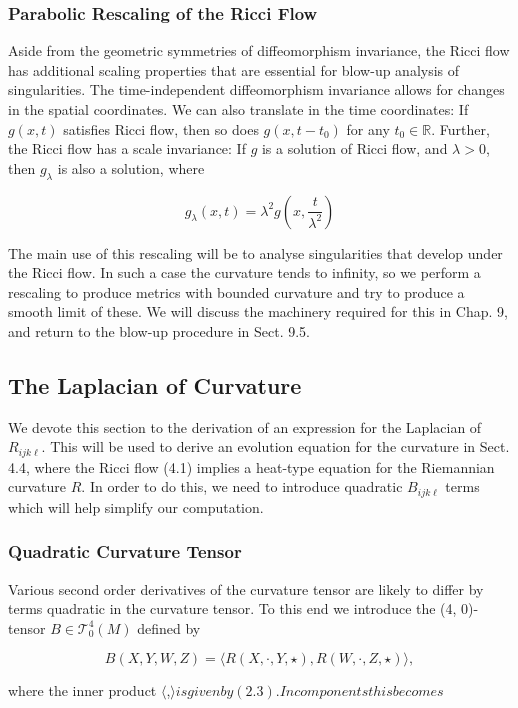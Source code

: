 \documentclass[10pt, letterpaper]{article}
\begin{document}
\subsubsection*{Parabolic Rescaling of the Ricci Flow}
Aside from the geometric symmetries of diffeomorphism invariance, the Ricci flow has additional scaling properties that are essential for blow-up analysis of singularities. The time-independent diffeomorphism invariance allows for changes in the spatial coordinates. We can also translate in the time coordinates: If $g(x, t)$ satisfies Ricci flow, then so does $g\left(x, t-t_{0}\right)$ for any $t_{0} \in \mathbb{R}$. Further, the Ricci flow has a scale invariance: If $g$ is a solution of Ricci flow, and $\lambda>0$, then $g_{\lambda}$ is also a solution, where

$$
g_{\lambda}(x, t)=\lambda^{2} g\left(x, \frac{t}{\lambda^{2}}\right)
$$

The main use of this rescaling will be to analyse singularities that develop under the Ricci flow. In such a case the curvature tends to infinity, so we perform a rescaling to produce metrics with bounded curvature and try to produce a smooth limit of these. We will discuss the machinery required for this in Chap. 9, and return to the blow-up procedure in Sect. 9.5.

\subsection*{The Laplacian of Curvature}
We devote this section to the derivation of an expression for the Laplacian of $R_{i j k \ell}$. This will be used to derive an evolution equation for the curvature in Sect. 4.4, where the Ricci flow (4.1) implies a heat-type equation for the Riemannian curvature $R$. In order to do this, we need to introduce quadratic $B_{i j k \ell}$ terms which will help simplify our computation.

\subsubsection*{Quadratic Curvature Tensor}
Various second order derivatives of the curvature tensor are likely to differ by terms quadratic in the curvature tensor. To this end we introduce the (4, 0)-tensor $B \in \mathscr{T}_{0}^{4}(M)$ defined by

$$
B(X, Y, W, Z)=\langle R(X, \cdot, Y, \star), R(W, \cdot, Z, \star)\rangle,
$$

where the inner product $\langle$,$\rangle is given by (2.3). In components this becomes$
\end{document}
